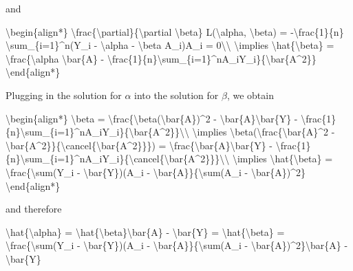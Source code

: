 \documentclass[
  11pt,
  letterpaper,
  DIV=11,
  numbers=noendperiod]{scrartcl}
\newenvironment{Shaded}{}{}
\newcommand{\NormalTok}[1]{\textcolor[rgb]{0.24,0.22,0.21}{#1}}
\begin{document}
and

\begin{Shaded}
\begin{Highlighting}[]
\NormalTok{\textbackslash{}begin\{align*\}}
\NormalTok{  \textbackslash{}frac\{\textbackslash{}partial\}\{\textbackslash{}partial \textbackslash{}beta\} L(\textbackslash{}alpha, \textbackslash{}beta) = {-}\textbackslash{}frac\{1\}\{n\} \textbackslash{}sum\_\{i=1\}\^{}n(Y\_i {-} \textbackslash{}alpha {-} \textbackslash{}beta A\_i)A\_i = 0\textbackslash{}\textbackslash{}}
\NormalTok{  \textbackslash{}implies \textbackslash{}hat\{\textbackslash{}beta\} = \textbackslash{}frac\{\textbackslash{}alpha \textbackslash{}bar\{A\} {-} \textbackslash{}frac\{1\}\{n\}\textbackslash{}sum\_\{i=1\}\^{}nA\_iY\_i\}\{\textbackslash{}bar\{A\^{}2\}\}}
\NormalTok{\textbackslash{}end\{align*\}}
\end{Highlighting}
\end{Shaded}

Plugging in the solution for \(\alpha\) into the solution for \(\beta\),
we obtain

\begin{Shaded}
\begin{Highlighting}[]
\NormalTok{\textbackslash{}begin\{align*\}}
\NormalTok{\textbackslash{}beta = \textbackslash{}frac\{\textbackslash{}beta(\textbackslash{}bar\{A\})\^{}2 {-} \textbackslash{}bar\{A\}\textbackslash{}bar\{Y\} {-} \textbackslash{}frac\{1\}\{n\}\textbackslash{}sum\_\{i=1\}\^{}nA\_iY\_i\}\{\textbackslash{}bar\{A\^{}2\}\}\textbackslash{}\textbackslash{}}
\NormalTok{\textbackslash{}implies \textbackslash{}beta(\textbackslash{}frac\{\textbackslash{}bar\{A\}\^{}2 {-} \textbackslash{}bar\{A\^{}2\}\}\{\textbackslash{}cancel\{\textbackslash{}bar\{A\^{}2\}\}\}) = \textbackslash{}frac\{\textbackslash{}bar\{A\}\textbackslash{}bar\{Y\} {-} \textbackslash{}frac\{1\}\{n\}\textbackslash{}sum\_\{i=1\}\^{}nA\_iY\_i\}\{\textbackslash{}cancel\{\textbackslash{}bar\{A\^{}2\}\}\}\textbackslash{}\textbackslash{}}
\NormalTok{\textbackslash{}implies \textbackslash{}hat\{\textbackslash{}beta\} = \textbackslash{}frac\{\textbackslash{}sum(Y\_i {-} \textbackslash{}bar\{Y\})(A\_i {-} \textbackslash{}bar\{A\}\}\{\textbackslash{}sum(A\_i {-} \textbackslash{}bar\{A\})\^{}2\}}
\NormalTok{\textbackslash{}end\{align*\}}
\end{Highlighting}
\end{Shaded}

and therefore

\begin{Shaded}
\begin{Highlighting}[]
\NormalTok{\textbackslash{}hat\{\textbackslash{}alpha\} =  \textbackslash{}hat\{\textbackslash{}beta\}\textbackslash{}bar\{A\} {-} \textbackslash{}bar\{Y\} = \textbackslash{}hat\{\textbackslash{}beta\} = \textbackslash{}frac\{\textbackslash{}sum(Y\_i {-} \textbackslash{}bar\{Y\})(A\_i {-} \textbackslash{}bar\{A\}\}\{\textbackslash{}sum(A\_i {-} \textbackslash{}bar\{A\})\^{}2\}\textbackslash{}bar\{A\} {-} \textbackslash{}bar\{Y\}}
\end{Highlighting}
\end{Shaded}
\end{document}
